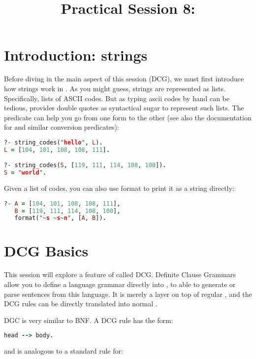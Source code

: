 \documentclass{../../../tp}
\title{Practical Session 8: \prolog}
\author{}
\begin{document}
	
	\maketitle
	

\section{Introduction: strings}	

Before diving in the main aspect of this session (DCG), we must first introduce how strings work in \prolog. As you might guess, strings are represented as lists. Specifically, lists of ASCII codes. But as typing ascii codes by hand can be tedious, \prolog provides double quotes as syntactical sugar to represent such lists. The  predicate can help you go from one form to the other (see also the documentation for  and similar conversion predicates):

\begin{lstlisting}[language=prolog]
?- string_codes("hello", L).
L = [104, 101, 108, 108, 111].

?- string_codes(S, [119, 111, 114, 108, 100]).
S = "world".
\end{lstlisting}

Given a list of codes, you can also use format to print it as a string directly:

\begin{lstlisting}[language=prolog]
?- A = [104, 101, 108, 108, 111], 
   B = [119, 111, 114, 108, 100], 
   format("~s ~s~n", [A, B]).
\end{lstlisting}

	
\section{DCG Basics}

This session will explore a feature of \prolog called DCG. Definite Clause Grammars allow you to define a language grammar directly into \prolog, to able to generate or parse sentences from this language. It is merely a layer on top of regular \prolog, and the DCG rules can be directly translated into normal \prolog.

DGC is very similar to BNF. A DCG rule has the form:

\begin{lstlisting}[language=prolog]
head --> body.
\end{lstlisting}

and is analogous to a standard \prolog rule for:
\end{document}
